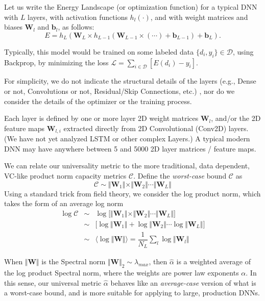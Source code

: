 Let us write the Energy Landscape (or optimization function) for a typical DNN with $L$ layers, with activation functions $h_{l}(\cdot)$, and with weight matrices and 
biases $\mathbf{W}_{l}$ and $\mathbf{b}_{l}$, as follows:
\begin{equation}
E=h_{L}(\mathbf{W}_{L}\times h_{L-1}(\mathbf{W}_{L-1}\times(\cdots)+\mathbf{b}_{L-1})+\mathbf{b}_{L})  .
\label{eqn:dnn_energy}
\end{equation}

Typically, this model would be trained on some labeled data $\{d_{i},y_{i}\}\in\mathcal{D}$, using Backprop\cite{BackProp}, by minimizing the loss $\mathcal{L}=\sum_{i\in\mathcal{D}}[E(d_{i})-y_{i}]$.

For simplicity, we do not indicate the structural details of the layers (e.g., Dense or not, Convolutions or not, Residual/Skip Connections, etc.) , nor
do we consider the details of the optimizer or the training process.

Each layer is defined by one or more layer 2D weight matrices $\mathbf{W}_{l}$, and/or the 2D feature maps $\mathbf{W}_{l,i}$ extracted directly from 2D Convolutional (Conv2D) layers.
(We have not yet analyzed LSTM or other complex Layers.)   A typical modern DNN may have anywhere between 5 and 5000 2D layer matrices / feature maps.

We can relate our universality metric to the more traditional, data dependent, VC-like product norm capacity metrics $\mathcal{C}$.
Define the \emph{worst-case} bound $\mathcal{C}$ as
\begin{equation}
\mathcal{C}\sim\Vert\mathbf{W}_{1}\Vert\times\Vert\mathbf{W}_{2}\Vert\cdots\Vert\mathbf{W}_{L}\Vert
\end{equation}
Using a standard trick from field theory, we consider the log product norm, which takes the form of an average log norm
\begin{eqnarray*}
\log\mathcal{C} &\sim& \log\bigg[\Vert\mathbf{W}_{1}\Vert\times\Vert\mathbf{W}_{2}\Vert\cdots\Vert\mathbf{W}_{L}\Vert\bigg]  \\
                &\sim& \bigg[\log\Vert\mathbf{W}_{1}\Vert+\log\Vert\mathbf{W}_{2}\Vert\cdots\log\Vert\mathbf{W}_{L}\Vert\bigg]  \\
                &\sim&  \langle\log\Vert\mathbf{W}\Vert\rangle=\dfrac{1}{N_{L}}\sum_{l}\log\Vert\mathbf{W}_{l}\Vert
\end{eqnarray*}

When $\Vert\mathbf{W}\Vert$ is the Spectral norm $\Vert\mathbf{W}\Vert_{2}\sim\lambda_{max}$, then $\hat{\alpha}$ is a weighted average of the log 
 product Spectral norm, where the weights are power law exponents $\alpha$. In this sense, our universal metric $\hat{\alpha}$ behaves
 like an \emph{average-case} version of what is a worst-case bound, and is more suitable for applying to large, production DNNs.
 
